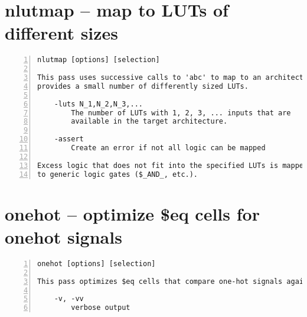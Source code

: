 \section{nlutmap -- map to LUTs of different sizes}
\label{cmd:nlutmap}
\begin{lstlisting}[numbers=left,frame=single]
    nlutmap [options] [selection]

This pass uses successive calls to 'abc' to map to an architecture. That
provides a small number of differently sized LUTs.

    -luts N_1,N_2,N_3,...
        The number of LUTs with 1, 2, 3, ... inputs that are
        available in the target architecture.

    -assert
        Create an error if not all logic can be mapped

Excess logic that does not fit into the specified LUTs is mapped back
to generic logic gates ($_AND_, etc.).
\end{lstlisting}

\section{onehot -- optimize \$eq cells for onehot signals}
\label{cmd:onehot}
\begin{lstlisting}[numbers=left,frame=single]
    onehot [options] [selection]

This pass optimizes $eq cells that compare one-hot signals against constants

    -v, -vv
        verbose output
\end{lstlisting}

